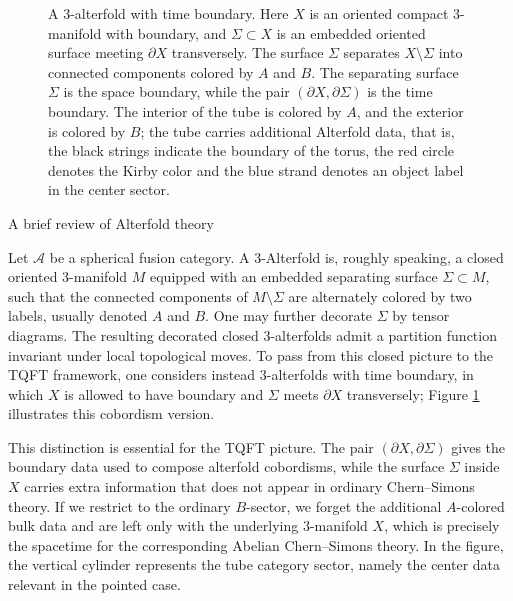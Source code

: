 \documentclass[12pt]{amsart}
\makeatletter
\renewcommand\subsection{\@startsection{subsection}{2}%
  \z@{.5\linespacing\@plus.7\linespacing}{-.5em}%
  {\normalfont\bfseries}}
\numberwithin{equation}{section}
\theoremstyle{definition}
\makeatother
\begin{document}
\begin{figure}[H]
\caption{A 3-alterfold with time boundary. Here $X$ is an oriented compact $3$-manifold with boundary, and $\Sigma\subset X$ is an embedded oriented surface meeting $\partial X$ transversely. The surface $\Sigma$ separates $X\setminus \Sigma$ into connected components colored by $A$ and $B$. The separating surface $\Sigma$ is the space boundary, while the pair $(\partial X,\partial \Sigma)$ is the time boundary. The interior of the tube is colored by $A$, and the exterior is colored by $B$; the tube carries additional Alterfold data, that is, the black strings indicate the boundary of the torus, the red circle denotes the Kirby color and the blue strand denotes an object label in the center sector.}\label{fig:alterfold}
\end{figure}

\subsection{A brief review of Alterfold theory}

Let $\mathcal A$ be a spherical fusion category. A $3$-Alterfold is, roughly speaking, a closed oriented $3$-manifold $M$ equipped with an embedded separating surface $\Sigma \subset M$, such that the connected components of $M\setminus \Sigma$ are alternately colored by two labels, usually denoted $A$ and $B$. One may further decorate $\Sigma$ by tensor diagrams. The resulting decorated closed $3$-alterfolds admit a partition function invariant under local topological moves. To pass from this closed picture to the TQFT framework, one considers instead $3$-alterfolds with time boundary, in which $X$ is allowed to have boundary and $\Sigma$ meets $\partial X$ transversely; Figure \ref{fig:alterfold} illustrates this cobordism version.


This distinction is essential for the TQFT picture. The pair $(\partial X,\partial \Sigma)$ gives the boundary data used to compose alterfold cobordisms, while the surface $\Sigma$ inside $X$ carries extra information that does not appear in ordinary Chern--Simons theory. If we restrict to the ordinary $B$-sector, we forget the additional $A$-colored bulk data and are left only with the underlying $3$-manifold $X$, which is precisely the spacetime for the corresponding Abelian Chern--Simons theory. In the figure, the vertical cylinder represents the tube category sector, namely the center data relevant in the pointed case.
\end{document}
